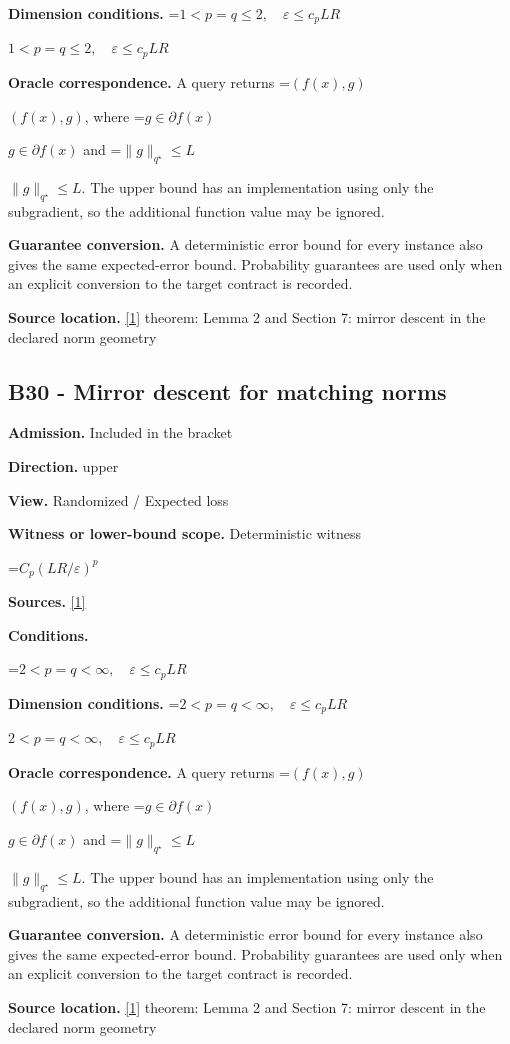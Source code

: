 \documentclass[10pt,a4paper]{article}
\newcommand{\AtlasMath}[1]{\par\begingroup\centering\setbox0=\hbox{$\displaystyle #1$}\ifdim\wd0>1.4\linewidth\typeout{ATLAS WIDE FORMULA: \the\wd0}\fi\ifdim\wd0>\linewidth\resizebox{\linewidth}{!}{\box0}\else\box0\fi\par\endgroup}
\newcommand{\AtlasInlineMath}[1]{\begingroup\setbox0=\hbox{$#1$}\ifdim\wd0>.4\linewidth\endgroup\AtlasMath{#1}\else\endgroup$#1$\fi}
\begin{document}
\textbf{Dimension conditions.} \AtlasInlineMath{1<p=q\le2,\quad\varepsilon\le c_pLR}

\textbf{Oracle correspondence.} A query returns \AtlasInlineMath{(f(x),g)}, where \AtlasInlineMath{g\in\partial f(x)} and \AtlasInlineMath{\|g\|_{q^\star}\le L}. The upper bound has an implementation using only the subgradient, so the additional function value may be ignored.

\textbf{Guarantee conversion.} A deterministic error bound for every instance also gives the same expected-error bound. Probability guarantees are used only when an explicit conversion to the target contract is recorded.

\textbf{Source location.} \href{https://arxiv.org/pdf/1107.4080}{[1]} theorem: Lemma 2 and Section 7: mirror descent in the declared norm geometry

\subsection{B30 - Mirror descent for matching norms}
\textbf{Admission.} Included in the bracket

\textbf{Direction.} upper

\textbf{View.} Randomized / Expected loss

\textbf{Witness or lower-bound scope.} Deterministic witness

\AtlasMath{C_p(LR/\varepsilon)^p}
\textbf{Sources.} \href{https://arxiv.org/pdf/1107.4080}{[1]}

\textbf{Conditions.} 
\AtlasMath{2<p=q<\infty,\quad\varepsilon\le c_pLR}


\textbf{Dimension conditions.} \AtlasInlineMath{2<p=q<\infty,\quad\varepsilon\le c_pLR}

\textbf{Oracle correspondence.} A query returns \AtlasInlineMath{(f(x),g)}, where \AtlasInlineMath{g\in\partial f(x)} and \AtlasInlineMath{\|g\|_{q^\star}\le L}. The upper bound has an implementation using only the subgradient, so the additional function value may be ignored.

\textbf{Guarantee conversion.} A deterministic error bound for every instance also gives the same expected-error bound. Probability guarantees are used only when an explicit conversion to the target contract is recorded.

\textbf{Source location.} \href{https://arxiv.org/pdf/1107.4080}{[1]} theorem: Lemma 2 and Section 7: mirror descent in the declared norm geometry
\end{document}

